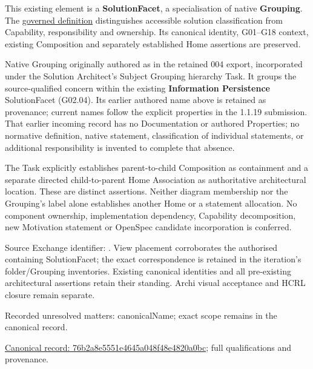 This existing element is a \textbf{SolutionFacet}, a specialisation of native
\textbf{Grouping}. The \href{\detokenize{../../../../../../../governance/continuum-representation.md#solutionfacet-classification--1119-candidate}}{governed definition}
distinguishes accessible solution classification from Capability, responsibility
and ownership. Its canonical identity, G01–G18 context, existing Composition
and separately established Home assertions are preserved.



Native Grouping originally authored as \texttt{} in the retained 004 export,
incorporated under the Solution Architect's Subject Grouping hierarchy Task.
It groups the source-qualified \texttt{} concern within
the existing \textbf{Information Persistence} SolutionFacet (G02.04). Its earlier authored name above is retained as provenance; current names
follow the explicit properties in the 1.1.19 submission.
That earlier incoming record has no Documentation or authored Properties; no normative
definition, native statement, classification of individual statements, or
additional responsibility is invented to complete that absence.



The Task explicitly establishes parent-to-child Composition as containment and
a separate directed child-to-parent Home Association as authoritative architectural
location. These are distinct assertions. Neither diagram membership nor the
Grouping's label alone establishes another Home or a statement allocation.
No component ownership, implementation dependency, Capability decomposition,
new Motivation statement or OpenSpec candidate incorporation is conferred.



Source Exchange identifier: \texttt{}. View placement corroborates
the authorised containing SolutionFacet; the exact correspondence is retained in the
iteration's folder/Grouping inventories. Existing canonical identities and all
pre-existing architectural assertions retain their standing. Archi visual
acceptance and HCRL closure remain separate.


{\small Recorded unresolved matters: canonicalName; exact scope remains in the canonical record.}\par
{\footnotesize \href{../../../../../../../continuum/grouping/76b2a8e5551e4645a048f48e4820a0bc.md}{Canonical record: 76b2a8e5551e4645a048f48e4820a0bc}; full qualifications and provenance.}\par
